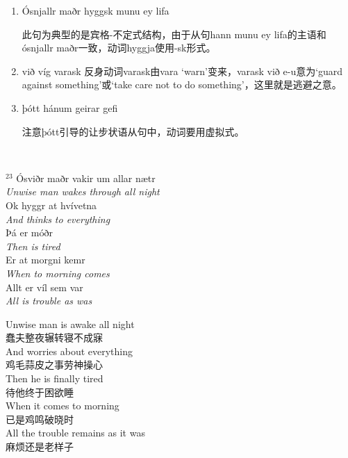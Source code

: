 \begin{grammar*}{}
    \begin{enumerate}[leftmargin=*]

        \item Ósnjallr maðr hyggsk munu ey lifa

              此句为典型的是宾格-不定式结构，由于从句hann munu ey lifa的主语和ósnjallr maðr一致，动词hyggja使用-sk形式。

        \item við víg varask
              反身动词varask由vara `warn'变来，varask við e-u意为`guard against something'或`take care not to do something'，这里就是逃避之意。

        \item þótt hánum geirar gefi

              注意þótt引导的让步状语从句中，动词要用虚拟式。

    \end{enumerate}
\end{grammar*}
\hspace*{\fill}\\ %
\begin{paracol}{2}
    \noindent
    $^{23}$ Ósviðr maðr vakir um allar nætr\\
    \textit{Unwise man wakes through all night}\\
    Ok hyggr at hvívetna\\
    \textit{And thinks to everything}\\
    \MakeUppercase þá er móðr\\
    \textit{Then is tired}\\
    Er at morgni kemr\\
    \textit{When to morning comes}\\
    Allt er víl sem var\\
    \textit{All is trouble as was}\\
    \switchcolumn

    \noindent
    Unwise man is awake all night\\
    蠢夫整夜辗转寝不成寐\\
    And worries about everything\\
    鸡毛蒜皮之事劳神操心\\
    Then he is finally tired\\
    待他终于困欲睡\\
    When it comes to morning \\
    已是鸡鸣破晓时\\
    All the trouble remains as it was \\
    麻烦还是老样子\\

\end{paracol}

